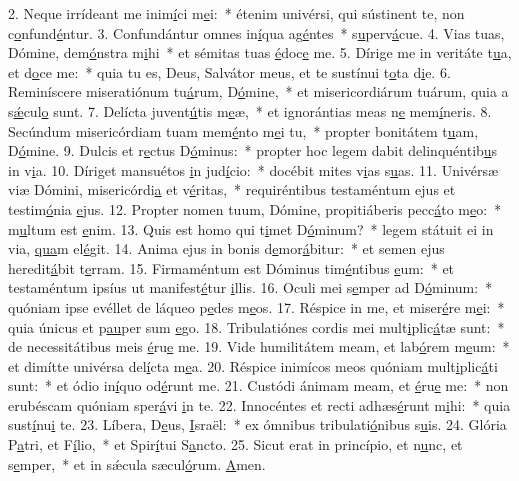 2. Neque irrídeant me inim\uline{í}ci m\uline{e}i:~* étenim univérsi, qui sústinent te, non c\uline{o}nfund\uline{é}ntur.
3. Confundántur omnes in\uline{í}qua ag\uline{é}ntes~* s\uline{u}perv\uline{á}cue.
4. Vias tuas, Dómine, dem\uline{ó}nstra m\uline{i}hi~* et sémitas tuas \uline{é}doc\uline{e} me.
5. Dírige me in veritáte t\uline{u}a, et d\uline{o}ce me:~* quia tu es, Deus, Salvátor meus, et te sustínui t\uline{o}ta d\uline{i}e.
6. Reminíscere miseratiónum tu\uline{á}rum, D\uline{ó}mine,~* et misericordiárum tuárum, quia a s\uline{ǽ}cul\uline{o} sunt.
7. Delícta juvent\uline{ú}tis m\uline{e}æ,~* et ignorántias meas n\uline{e} mem\uline{í}neris.
8. Secúndum misericórdiam tuam mem\uline{é}nto m\uline{e}i tu,~* propter bonitátem t\uline{u}am, D\uline{ó}mine.
9. Dulcis et r\uline{e}ctus D\uline{ó}minus:~* propter hoc legem dabit delinquéntib\uline{u}s in v\uline{i}a.
10. Díriget mansuétos \uline{i}n jud\uline{í}cio:~* docébit mites v\uline{i}as s\uline{u}as.
11. Univérsæ viæ Dómini, misericórdi\uline{a} et v\uline{é}ritas,~* requiréntibus testaméntum ejus et testim\uline{ó}nia \uline{e}jus.
12. Propter nomen tuum, Dómine, propitiáberis pecc\uline{á}to m\uline{e}o:~* m\uline{u}ltum est \uline{e}nim.
13. Quis est homo qui t\uline{i}met D\uline{ó}minum?~* legem státuit ei in via, \uline{qua}m el\uline{é}git.
14. Anima ejus in bonis d\uline{e}mor\uline{á}bitur:~* et semen ejus heredit\uline{á}bit t\uline{e}rram.
15. Firmaméntum est Dóminus tim\uline{é}ntibus \uline{e}um:~* et testaméntum ipsíus ut manifest\uline{é}tur \uline{i}llis.
16. Oculi mei s\uline{e}mper ad D\uline{ó}minum:~* quóniam ipse evéllet de láqueo p\uline{e}des m\uline{e}os.
17. Réspice in me, et miser\uline{é}re m\uline{e}i:~* quia únicus et p\uline{au}per sum \uline{e}go.
18. Tribulatiónes cordis mei mult\uline{i}plic\uline{á}tæ sunt:~* de necessitátibus meis \uline{é}ru\uline{e} me.
19. Vide humilitátem meam, et lab\uline{ó}rem m\uline{e}um:~* et dimítte univérsa del\uline{í}cta m\uline{e}a.
20. Réspice inimícos meos quóniam mult\uline{i}plic\uline{á}ti sunt:~* et ódio in\uline{í}quo od\uline{é}runt me.
21. Custódi ánimam meam, et \uline{é}ru\uline{e} me:~* non erubéscam quóniam sper\uline{á}vi \uline{i}n te.
22. Innocéntes et recti adhæs\uline{é}runt m\uline{i}hi:~* quia sust\uline{í}nu\uline{i} te.
23. Líbera, D\uline{e}us, \uline{I}sraël:~* ex ómnibus tribulati\uline{ó}nibus s\uline{u}is.
24. Glória P\uline{a}tri, et F\uline{í}lio,~* et Spir\uline{í}tui S\uline{a}ncto.
25. Sicut erat in princípio, et n\uline{u}nc, et s\uline{e}mper,~* et in sǽcula sæcul\uline{ó}rum. \uline{A}men.
